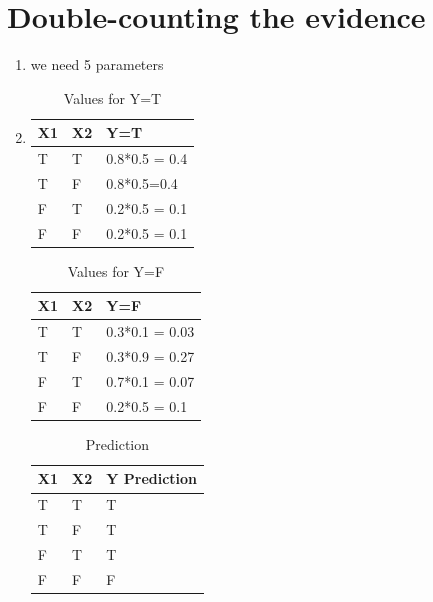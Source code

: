 \section{Double-counting the evidence}

\begin{enumerate}
\item we need 5 parameters

\item 
\begin{table}[H]
\centering
\caption{Values for Y=T}
\label{Probabilities}
\begin{tabular}{|l|l|l|}
\hline
\textbf{X1} & \textbf{X2} & \textbf{Y=T}  \\ \hline
T           & T           & 0.8*0.5 = 0.4 \\ \hline
T           & F           & 0.8*0.5=0.4   \\ \hline
F           & T           & 0.2*0.5 = 0.1 \\ \hline
F           & F           & 0.2*0.5 = 0.1 \\ \hline
\end{tabular}
\end{table}
\begin{table}[H]
\centering
\caption{Values for Y=F}
\label{Probabilities}
\begin{tabular}{|l|l|l|}
\hline
\textbf{X1} & \textbf{X2} & \textbf{Y=F}   \\ \hline
T           & T           & 0.3*0.1 = 0.03 \\ \hline
T           & F           & 0.3*0.9 = 0.27 \\ \hline
F           & T           & 0.7*0.1 = 0.07 \\ \hline
F           & F           & 0.2*0.5 = 0.1  \\ \hline
\end{tabular}
\end{table}
\begin{table}[H]
\centering
\caption{Prediction}
\label{my-label}
\begin{tabular}{|l|l|l|}
\hline
\textbf{X1} & \textbf{X2} & \textbf{Y Prediction} \\ \hline
T           & T           & T                     \\ \hline
T           & F           & T                     \\ \hline
F           & T           & T                     \\ \hline
F           & F           & F        \\ \hline
\end{tabular}
\end{table}


\end{enumerate}
